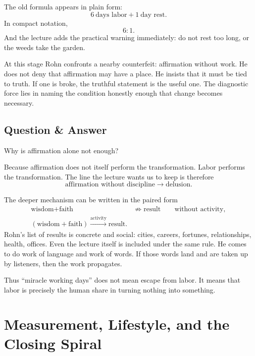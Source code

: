 The old formula appears in plain form:
\begin{equation}
6\ \text{days labor} + 1\ \text{day rest}.
\end{equation}
In compact notation,
\begin{equation}
6:1.
\end{equation}
And the lecture adds the practical warning immediately: do not rest too long, or the weeds take the garden.

At this stage Rohn confronts a nearby counterfeit: affirmation without work. He does not deny that affirmation may have a place. He insists that it must be tied to truth. If one is broke, the truthful statement is the useful one. The diagnostic force lies in naming the condition honestly enough that change becomes necessary.

\subsection{Question \& Answer}

Why is affirmation alone not enough?

Because affirmation does not itself perform the transformation. Labor performs the transformation. The line the lecture wants us to keep is therefore
\begin{equation}
\text{affirmation without discipline} \to \text{delusion}.
\end{equation}

The deeper mechanism can be written in the paired form
\begin{align}
\text{wisdom}+\text{faith} &\not\Rightarrow \text{result}
\qquad \text{without activity},\\
(\text{wisdom}+\text{faith}) \xrightarrow{\text{activity}} \text{result}.
\end{align}
Rohn's list of results is concrete and social: cities, careers, fortunes, relationships, health, offices. Even the lecture itself is included under the same rule. He comes to do work of language and work of words. If those words land and are taken up by listeners, then the work propagates.

Thus ``miracle working days'' does not mean escape from labor. It means that labor is precisely the human share in turning nothing into something.

\section{Measurement, Lifestyle, and the Closing Spiral}

